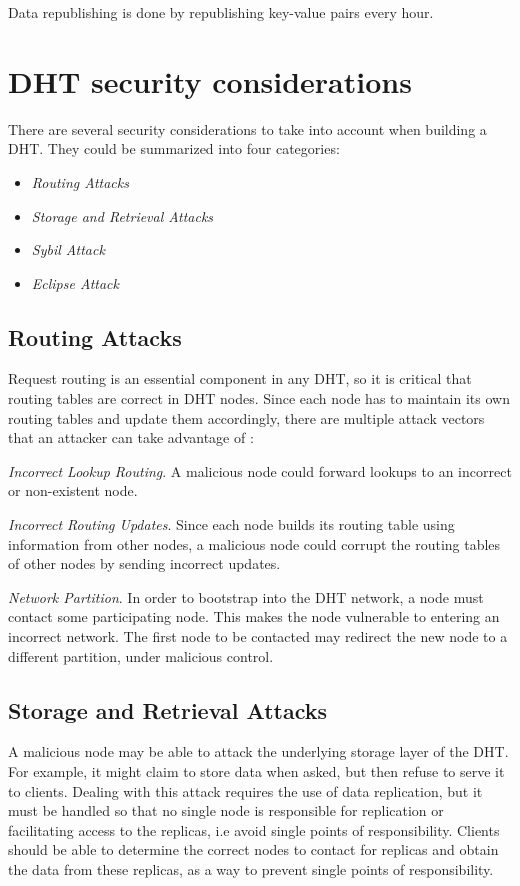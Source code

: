 Data republishing is done by republishing key-value pairs every hour.

\section{\ac{DHT} security considerations}
There are several security considerations \cite{Urdaneta2011} to take into
account when building a \ac{DHT}. They could be summarized into four categories:
\begin{itemize}
    \item \textit{Routing Attacks}
    \item \textit{Storage and Retrieval Attacks}
    \item \textit{Sybil Attack}
    \item \textit{Eclipse Attack}
\end{itemize}

\subsection{Routing Attacks} \label{ssec:routing-attacks}
Request routing is an essential component in any \ac{DHT}, so it is critical that
routing tables are correct in \ac{DHT} nodes. Since each node has to maintain its
own routing tables and update them accordingly, there are multiple attack
vectors that an attacker can take advantage of \cite{Castro2002}:

\textit{Incorrect Lookup Routing}. A malicious node could forward lookups to an
incorrect or non-existent node.

\textit{Incorrect Routing Updates}. Since each node builds its routing table
using information from other nodes, a malicious node could corrupt the routing
tables of other nodes by sending incorrect updates.

\textit{Network Partition}. In order to bootstrap into the \ac{DHT} network, a node must contact some participating node. This makes the node vulnerable to entering an incorrect network.
The first node to be contacted may redirect the new node to a different partition, under malicious control.

\subsection{Storage and Retrieval Attacks}

A malicious node may be able to attack the underlying storage layer of the \ac{DHT}.
For example, it might claim to store data when asked, but then refuse to
serve it to clients.
Dealing with this attack requires the use of data replication, but it must be
handled so that no single node is responsible for replication or
facilitating access to the replicas, i.e avoid single points of
responsibility.
Clients should be able to determine the correct nodes to contact for replicas and obtain the data from these replicas, as a way to prevent single points of responsibility.

